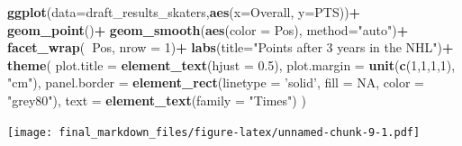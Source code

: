 \documentclass[]{article}
\newenvironment{Shaded}{\begin{snugshade}}{\end{snugshade}}
\newcommand{\DataTypeTok}[1]{\textcolor[rgb]{0.13,0.29,0.53}{#1}}
\newcommand{\DecValTok}[1]{\textcolor[rgb]{0.00,0.00,0.81}{#1}}
\newcommand{\FloatTok}[1]{\textcolor[rgb]{0.00,0.00,0.81}{#1}}
\newcommand{\KeywordTok}[1]{\textcolor[rgb]{0.13,0.29,0.53}{\textbf{#1}}}
\newcommand{\NormalTok}[1]{#1}
\newcommand{\OperatorTok}[1]{\textcolor[rgb]{0.81,0.36,0.00}{\textbf{#1}}}
\newcommand{\OtherTok}[1]{\textcolor[rgb]{0.56,0.35,0.01}{#1}}
\newcommand{\StringTok}[1]{\textcolor[rgb]{0.31,0.60,0.02}{#1}}
\begin{document}
\begin{Shaded}
\begin{Highlighting}[]
\KeywordTok{ggplot}\NormalTok{(}\DataTypeTok{data=}\NormalTok{draft_results_skaters,}\KeywordTok{aes}\NormalTok{(}\DataTypeTok{x=}\NormalTok{Overall, }\DataTypeTok{y=}\NormalTok{PTS))}\OperatorTok{+}
\StringTok{  }\KeywordTok{geom_point}\NormalTok{()}\OperatorTok{+}
\StringTok{  }\KeywordTok{geom_smooth}\NormalTok{(}\KeywordTok{aes}\NormalTok{(}\DataTypeTok{color =}\NormalTok{ Pos), }\DataTypeTok{method=}\StringTok{"auto"}\NormalTok{)}\OperatorTok{+}
\StringTok{  }\KeywordTok{facet_wrap}\NormalTok{(}\OperatorTok{~}\NormalTok{Pos, }\DataTypeTok{nrow =} \DecValTok{1}\NormalTok{)}\OperatorTok{+}
\StringTok{  }\KeywordTok{labs}\NormalTok{(}\DataTypeTok{title=}\StringTok{"Points after 3 years in the NHL"}\NormalTok{)}\OperatorTok{+}
\StringTok{  }\KeywordTok{theme}\NormalTok{(}
    \DataTypeTok{plot.title =} \KeywordTok{element_text}\NormalTok{(}\DataTypeTok{hjust =} \FloatTok{0.5}\NormalTok{),}
    \DataTypeTok{plot.margin =} \KeywordTok{unit}\NormalTok{(}\KeywordTok{c}\NormalTok{(}\DecValTok{1}\NormalTok{,}\DecValTok{1}\NormalTok{,}\DecValTok{1}\NormalTok{,}\DecValTok{1}\NormalTok{), }\StringTok{"cm"}\NormalTok{),}
    \DataTypeTok{panel.border =} \KeywordTok{element_rect}\NormalTok{(}\DataTypeTok{linetype =} \StringTok{'solid'}\NormalTok{, }\DataTypeTok{fill =} \OtherTok{NA}\NormalTok{, }\DataTypeTok{color =} \StringTok{"grey80"}\NormalTok{),}
    \DataTypeTok{text =} \KeywordTok{element_text}\NormalTok{(}\DataTypeTok{family =} \StringTok{"Times"}\NormalTok{)}
\NormalTok{    )}
\end{Highlighting}
\end{Shaded}

\texttt{[image: final\_markdown\_files/figure-latex/unnamed-chunk-9-1.pdf]}
\end{document}
